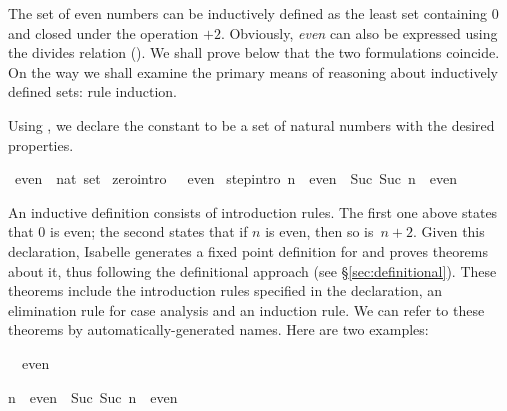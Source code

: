 %
\begin{isabellebody}%
\def\isabellecontext{Even}%
%
\isadelimtheory
%
\endisadelimtheory
%
\isatagtheory
%
\endisatagtheory
{\isafoldtheory}%
%
\isadelimtheory
%
\endisadelimtheory
%
\isamarkuptrue%
%
\begin{isamarkuptext}%
%
The set of even numbers can be inductively defined as the least set
containing 0 and closed under the operation $+2$.  Obviously,
\emph{even} can also be expressed using the divides relation (). 
We shall prove below that the two formulations coincide.  On the way we
shall examine the primary means of reasoning about inductively defined
sets: rule induction.%
\end{isamarkuptext}%
\isamarkuptrue%
%
\isamarkuptrue%
%
\begin{isamarkuptext}%
Using , we declare the constant  to be
a set of natural numbers with the desired properties.%
\end{isamarkuptext}%
\isamarkuptrue%
\isamarkupfalse%
\ even\ {\isacharcolon}{\isacharcolon}\ {\isachardoublequoteopen}nat\ set{\isachardoublequoteclose}\ \isanewline
zero{\isacharbrackleft}intro{\isacharbang}{\isacharbrackright}{\isacharcolon}\ {\isachardoublequoteopen}{}\ {\isasymin}\ even{\isachardoublequoteclose}\ {\isacharbar}\isanewline
step{\isacharbrackleft}intro{\isacharbang}{\isacharbrackright}{\isacharcolon}\ {\isachardoublequoteopen}n\ {\isasymin}\ even\ {\isasymLongrightarrow}\ {\isacharparenleft}Suc\ {\isacharparenleft}Suc\ n{\isacharparenright}{\isacharparenright}\ {\isasymin}\ even{\isachardoublequoteclose}%
\begin{isamarkuptext}%
An inductive definition consists of introduction rules.  The first one
above states that 0 is even; the second states that if $n$ is even, then so
is~$n+2$.  Given this declaration, Isabelle generates a fixed point
definition for  and proves theorems about it,
thus following the definitional approach (see {\S}\ref{sec:definitional}).
These theorems
include the introduction rules specified in the declaration, an elimination
rule for case analysis and an induction rule.  We can refer to these
theorems by automatically-generated names.  Here are two examples:
\begin{isabelle}%
{}\ {\isasymin}\ even\par\smallskip%
n\ {\isasymin}\ even\ {\isasymLongrightarrow}\ Suc\ {\isacharparenleft}Suc\ n{\isacharparenright}\ {\isasymin}\ even%
\end{isabelle}


\end{isamarkuptext}
\end{isabellebody}
